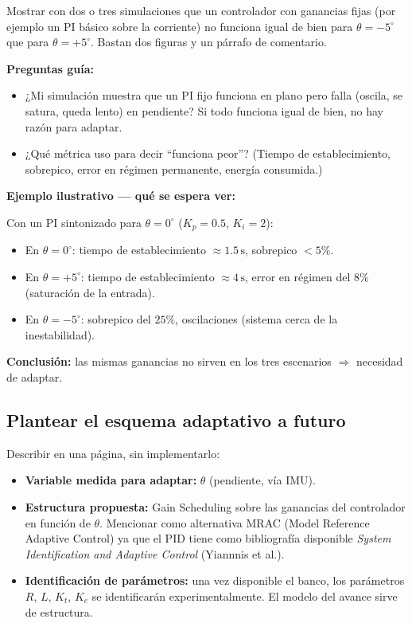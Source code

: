 \documentclass[11pt,a4paper]{article}
\newcommand{\unit}[1]{\,\mathrm{#1}}
\begin{document}
Mostrar con dos o tres simulaciones que un controlador con ganancias fijas (por ejemplo un PI básico sobre la corriente) no funciona igual de bien para $\theta = -5^\circ$ que para $\theta = +5^\circ$. Bastan dos figuras y un párrafo de comentario.

\begin{guia}
\textbf{Preguntas guía:}
\begin{itemize}
    \item ¿Mi simulación muestra que un PI fijo funciona en plano pero falla (oscila, se satura, queda lento) en pendiente? Si todo funciona igual de bien, no hay razón para adaptar.
    \item ¿Qué métrica uso para decir ``funciona peor''? (Tiempo de establecimiento, sobrepico, error en régimen permanente, energía consumida.)
\end{itemize}
\end{guia}

\begin{ejemplo}
\textbf{Ejemplo ilustrativo --- qué se espera ver:}

Con un PI sintonizado para $\theta = 0^\circ$ ($K_p = 0.5$, $K_i = 2$):
\begin{itemize}
    \item En $\theta = 0^\circ$: tiempo de establecimiento $\approx 1.5\unit{s}$, sobrepico $< 5\%$.
    \item En $\theta = +5^\circ$: tiempo de establecimiento $\approx 4\unit{s}$, error en régimen del $8\%$ (saturación de la entrada).
    \item En $\theta = -5^\circ$: sobrepico del $25\%$, oscilaciones (sistema cerca de la inestabilidad).
\end{itemize}

\textbf{Conclusión:} las mismas ganancias no sirven en los tres escenarios $\Rightarrow$ necesidad de adaptar.
\end{ejemplo}

\subsection{Plantear el esquema adaptativo a futuro}

Describir en una página, sin implementarlo:

\begin{itemize}
    \item \textbf{Variable medida para adaptar:} $\theta$ (pendiente, vía IMU).
    \item \textbf{Estructura propuesta:} Gain Scheduling sobre las ganancias del controlador en función de $\theta$. Mencionar como alternativa MRAC (Model Reference Adaptive Control) ya que el PID tiene como bibliografía disponible \textit{System Identification and Adaptive Control} (Yiannnis et al.).
    \item \textbf{Identificación de parámetros:} una vez disponible el banco, los parámetros $R$, $L$, $K_t$, $K_e$ se identificarán experimentalmente. El modelo del avance sirve de estructura.
\end{itemize}
\end{document}
